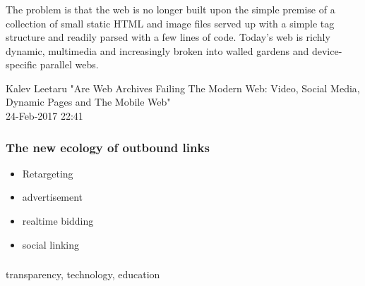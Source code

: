 \documentclass[aspectratio=169]{beamer}
\newcommand\blfootnote[1]{%
  \begingroup
  \renewcommand\thefootnote{}\footnote{#1}%
  \addtocounter{footnote}{-1}%
  \endgroup
}
\begin{document}
\begin{frame}
\frametitle{}
\epigraph{The problem is that the web is no longer built upon the simple premise of a collection of small static HTML and image files served up with a simple tag structure and readily parsed with a few lines of code. Today’s web is richly dynamic, multimedia and increasingly broken into walled gardens and device-specific parallel webs.}{Kalev Leetaru "Are Web Archives Failing The Modern Web: Video, Social Media, Dynamic Pages and The Mobile Web"\\ 24-Feb-2017 22:41}
% 
\end{frame}
\begin{frame}
\frametitle{The new ecology of outbound links}
\begin{itemize}
\item{Retargeting}
\item{advertisement}
\item{realtime bidding}
\item{social linking}
\end{itemize}
\end{frame}

\begin{frame}
\frametitle{}
\end{frame}

\begin{frame}
transparency, technology, education


\end{frame}
\end{document}
